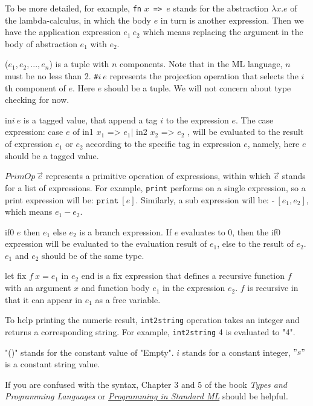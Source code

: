 \documentclass{article}
\theoremstyle{definition}
\theoremstyle{remark}
\numberwithin{equation}{section}
\begin{document}
To be more detailed, for example, \texttt{fn} $x$\texttt{ => }$e$
stands for the abstraction $\lambda x. e$ of the lambda-calculus, in
 which the body $e$ in turn is another expression. Then we have the application
 expression $e_1\ e_2$ which means replacing the argument in the body of
 abstraction $e_1$ with $e_2$.

($e_1,e_2, ..., e_n$) is a tuple with $n$ components. Note that in the
ML language, $n$ must be no less than 2.
 \texttt{\#}$i\ e$ represents  the projection operation that selects
  the $i$th component of $e$. Here $e$ should be a tuple. We will
not concern about type checking for now.

\textsf{in}$i\ e$ is a tagged value, that append a tag $i$ to the
expression $e$. The case expression: \textsf{case }$e$ \textsf{of in1 }
$x_1\texttt{ => } e_1|$ \textsf{in2 }$x_2 \texttt{ => } e_2$ ,
will be evaluated to the result of expression $e_1$ or $e_2$ according to
the specific tag in expression $e$, namely, here $e$ should be a tagged
value.

$PrimOp\ \vec{e}$ represents a primitive operation of expressions,
within which $\vec{e}$ stands for a list of expressions. For example,
\texttt{print} performs on a single expression, so a print expression will be:
 $\texttt{print}\ [e]$. Similarly, a sub expression will be:
 $\texttt{-}\ [e_1, e_2]$, which means $e_1 - e_2$.

\textsf{if0 }$e$\textsf{ then }$e_1$\textsf{ else }$e_2$ is a branch
expression. If $e$ evaluates to 0, then the if0 expression will be
evaluated to the evaluation result of $e_1$, else to the result of
$e_2$. $e_1$ and $e_2$ should be of the same type.

\textsf{let fix }$f\ x=e_1$\textsf{ in }$e_2$\textsf{ end} is a fix
expression that defines a recursive function $f$ with an argument
$x$ and function body $e_1$ in the expression $e_2$. $f$ is recursive
in that it can appear in $e_1$ as a free variable.

To help printing the numeric result, \texttt{int2string}
operation takes an integer and returns a corresponding
string. For example, \texttt{int2string} 4 is evaluated to "4".

"\textsf{()}" stands for the constant value of "Empty". $i$ stands for
a constant integer, $"s"$ is a constant string value.

If you are confused with the syntax, Chapter 3 and 5 of the book
\textit{Types and Programming Languages} or \href{
http://www.cs.cmu.edu/~rwh/smlbook/}{\textit{Programming in Standard ML}}
 should be helpful.\\
\end{document}
